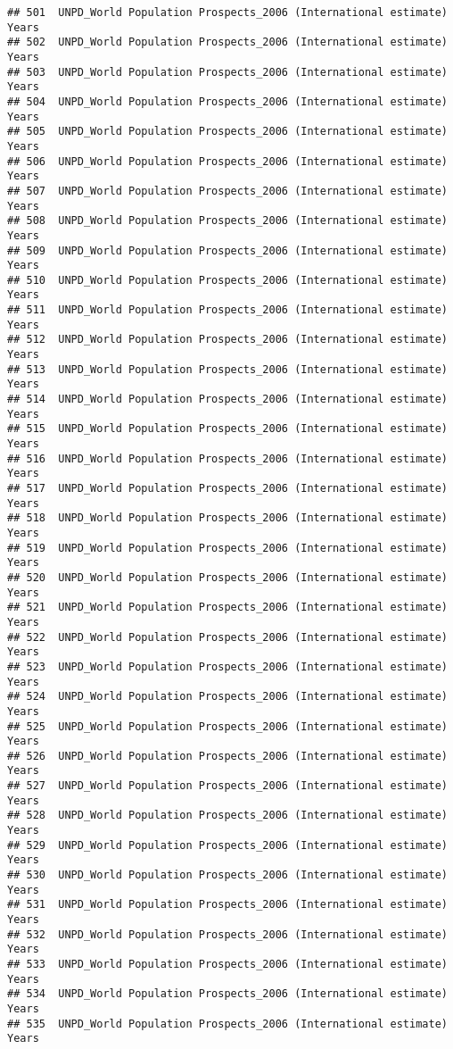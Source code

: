 \documentclass[]{article}
\begin{document}
\begin{verbatim}
## 501  UNPD_World Population Prospects_2006 (International estimate) Years
## 502  UNPD_World Population Prospects_2006 (International estimate) Years
## 503  UNPD_World Population Prospects_2006 (International estimate) Years
## 504  UNPD_World Population Prospects_2006 (International estimate) Years
## 505  UNPD_World Population Prospects_2006 (International estimate) Years
## 506  UNPD_World Population Prospects_2006 (International estimate) Years
## 507  UNPD_World Population Prospects_2006 (International estimate) Years
## 508  UNPD_World Population Prospects_2006 (International estimate) Years
## 509  UNPD_World Population Prospects_2006 (International estimate) Years
## 510  UNPD_World Population Prospects_2006 (International estimate) Years
## 511  UNPD_World Population Prospects_2006 (International estimate) Years
## 512  UNPD_World Population Prospects_2006 (International estimate) Years
## 513  UNPD_World Population Prospects_2006 (International estimate) Years
## 514  UNPD_World Population Prospects_2006 (International estimate) Years
## 515  UNPD_World Population Prospects_2006 (International estimate) Years
## 516  UNPD_World Population Prospects_2006 (International estimate) Years
## 517  UNPD_World Population Prospects_2006 (International estimate) Years
## 518  UNPD_World Population Prospects_2006 (International estimate) Years
## 519  UNPD_World Population Prospects_2006 (International estimate) Years
## 520  UNPD_World Population Prospects_2006 (International estimate) Years
## 521  UNPD_World Population Prospects_2006 (International estimate) Years
## 522  UNPD_World Population Prospects_2006 (International estimate) Years
## 523  UNPD_World Population Prospects_2006 (International estimate) Years
## 524  UNPD_World Population Prospects_2006 (International estimate) Years
## 525  UNPD_World Population Prospects_2006 (International estimate) Years
## 526  UNPD_World Population Prospects_2006 (International estimate) Years
## 527  UNPD_World Population Prospects_2006 (International estimate) Years
## 528  UNPD_World Population Prospects_2006 (International estimate) Years
## 529  UNPD_World Population Prospects_2006 (International estimate) Years
## 530  UNPD_World Population Prospects_2006 (International estimate) Years
## 531  UNPD_World Population Prospects_2006 (International estimate) Years
## 532  UNPD_World Population Prospects_2006 (International estimate) Years
## 533  UNPD_World Population Prospects_2006 (International estimate) Years
## 534  UNPD_World Population Prospects_2006 (International estimate) Years
## 535  UNPD_World Population Prospects_2006 (International estimate) Years

\end{verbatim}
\end{document}
